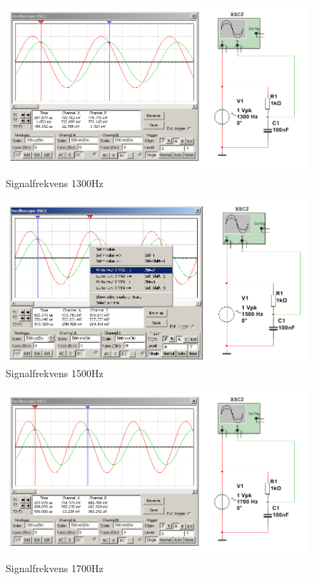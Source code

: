 \documentclass[11pt,a4paper]{article}
\begin{document}
\begin{figure}[htbp]
    \centering
    \includegraphics[scale=0.5]{ee466multisim/5-1300Hz.png}
    \caption{Signalfrekvens 1300Hz}
    \label{fig:sim-5-1300Hz}
\end{figure}

\begin{figure}[htbp]
    \centering
    \includegraphics[scale=0.5]{ee466multisim/5-1500Hz.png}
    \caption{Signalfrekvens 1500Hz}
    \label{fig:sim-5-1500Hz}
\end{figure}

\begin{figure}[htbp]
    \centering
    \includegraphics[scale=0.5]{ee466multisim/5-1700Hz.png}
    \caption{Signalfrekvens 1700Hz}
    \label{fig:sim-5-1700Hz}
\end{figure}
\end{document}
